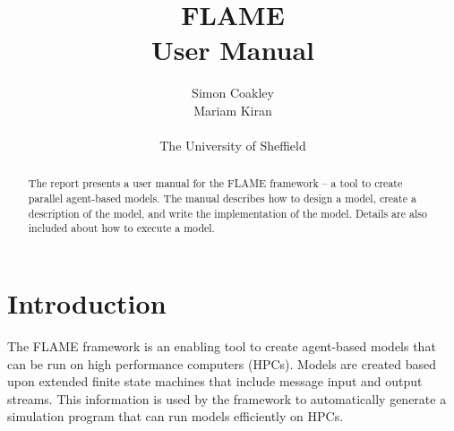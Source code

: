 \documentclass[12pt,a4paper]{article}
\begin{document}
\title{FLAME
\\User Manual}
\author{Simon Coakley\\Mariam Kiran
\\
\\ The University of Sheffield}

\maketitle



\begin{abstract}
The report presents a user manual for the FLAME framework -- a tool to create
parallel agent-based models. The manual describes how to design a model, create
a description of the model, and write the implementation of the model. 
Details are also included about how to execute a model.
\end{abstract}


\section{Introduction}

The FLAME framework is an enabling tool to create agent-based models that can
be run on high performance computers (HPCs). Models are created based upon
extended finite state machines that include message input and output streams.
This information is used by the framework to automatically generate a simulation program that
can run models efficiently on HPCs.










%
%
\end{document}
